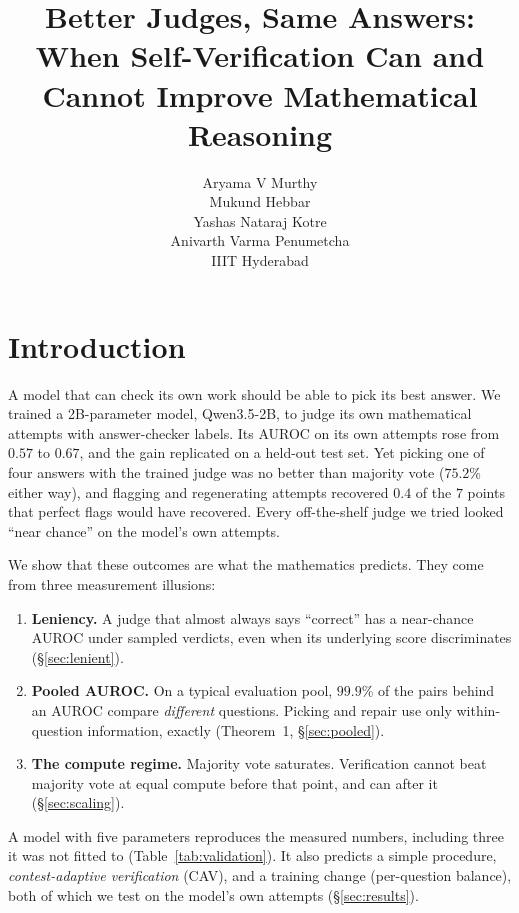 \documentclass[11pt]{article}
\title{Better Judges, Same Answers:\\When Self-Verification Can and Cannot Improve Mathematical Reasoning}
\author{Aryama V Murthy \\ Mukund Hebbar \\ Yashas Nataraj Kotre \\ Anivarth Varma Penumetcha \\ IIIT Hyderabad}
\begin{document}
\maketitle



\section{Introduction}
\label{sec:intro}

A model that can check its own work should be able to pick its best answer. We trained a 2B-parameter model,
Qwen3.5-2B, to judge its own mathematical attempts with answer-checker labels. Its AUROC on its own attempts rose from
$0.57$ to $0.67$, and the gain replicated on a held-out test set. Yet picking one of four answers with the trained
judge was no better than majority vote ($75.2\%$ either way), and flagging and regenerating attempts recovered $0.4$ of
the $7$ points that perfect flags would have recovered. Every off-the-shelf judge we tried looked ``near chance'' on
the model's own attempts.

We show that these outcomes are what the mathematics predicts. They come from three measurement illusions:
\begin{enumerate}
\item \textbf{Leniency.} A judge that almost always says ``correct'' has a near-chance AUROC under sampled verdicts,
  even when its underlying score discriminates (\S\ref{sec:lenient}).
\item \textbf{Pooled AUROC.} On a typical evaluation pool, $99.9\%$ of the pairs behind an AUROC compare
  \emph{different} questions. Picking and repair use only within-question information, exactly
  (Theorem~1, \S\ref{sec:pooled}).
\item \textbf{The compute regime.} Majority vote saturates. Verification cannot beat majority vote at equal compute
  before that point, and can after it (\S\ref{sec:scaling}).
\end{enumerate}

A model with five parameters reproduces the measured numbers, including three it was not fitted to
(Table~\ref{tab:validation}). It also predicts a simple procedure, \emph{contest-adaptive verification} (CAV), and a
training change (per-question balance), both of which we test on the model's own attempts
(\S\ref{sec:results}).
\end{document}
